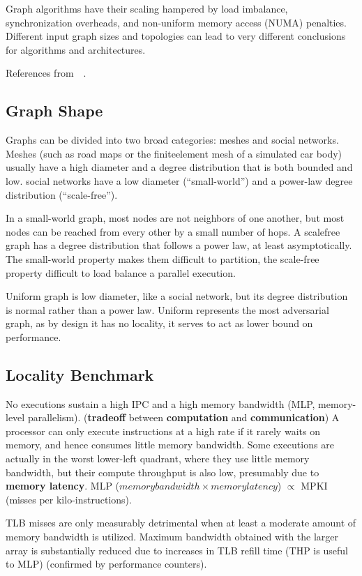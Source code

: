 \documentclass[UTF8,12pt,a4paper]{article}
\begin{document}
Graph algorithms have their scaling hampered by
load imbalance, synchronization overheads, and non-uniform memory access (NUMA) penalties.
Different input graph sizes and topologies can lead to
very different conclusions for algorithms and architectures.

References from~\cite{DBLP:conf/iiswc/BeamerAP15}~\cite{DBLP:conf/usenix/MalicevicLZ17}.

\subsection{Graph Shape}
Graphs can be divided into two broad categories: meshes and social networks.
Meshes (such as road maps or the finiteelement mesh of a simulated car body)
usually have a high diameter
and a degree distribution that is both bounded and low.
social networks have a low diameter (``small-world'')
and a power-law degree distribution (``scale-free'').

In a small-world graph, most nodes are not neighbors of one another,
but most nodes can be reached from every other by a small number of hops.
A scalefree graph has a degree distribution
that follows a power law, at least asymptotically.
The small-world property makes them difficult to partition,
the scale-free property difficult to load balance a parallel execution.

Uniform graph is low diameter, like a social network,
but its degree distribution is normal rather than a power law.
Uniform represents the most adversarial graph,
as by design it has no locality,
it serves to act as lower bound on performance.

\subsection{Locality Benchmark}
No executions sustain a high IPC and a high memory bandwidth
(MLP, memory-level parallelism).
(\textbf{tradeoff} between \textbf{computation} and \textbf{communication})
A processor can only execute instructions at a high rate
if it rarely waits on memory, and hence consumes little memory bandwidth.
Some executions are actually in the worst lower-left quadrant,
where they use little memory bandwidth, but their compute throughput is also low,
presumably due to \textbf{memory latency}.
MLP ($memory bandwidth \times memory latency$) $\propto$ MPKI (misses per kilo-instructions).

TLB misses are only measurably detrimental when
at least a moderate amount of memory bandwidth is utilized.
Maximum bandwidth obtained with the larger array is substantially
reduced due to increases in TLB refill time (THP is useful to MLP)
(confirmed by performance counters).
\end{document}
